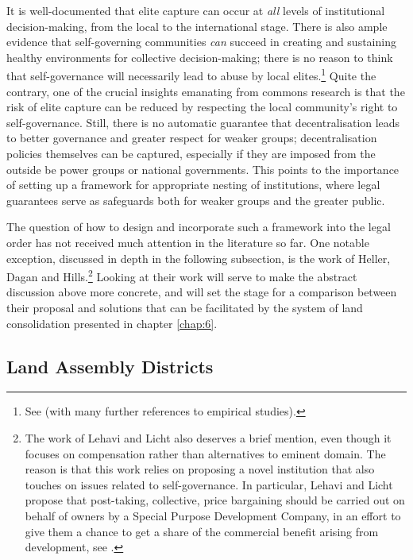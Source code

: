 It is well-documented that elite capture can occur at {\it all} levels of institutional decision-making, from the local to the international stage. There is also ample evidence that self-governing communities {\it can} succeed in creating and sustaining healthy environments for collective decision-making; there is no reason to think that self-governance will necessarily lead to abuse by local elites.\footnote{See \cite{andersson08} (with many further references to empirical studies).} Quite the contrary, one of the crucial insights emanating from commons research is that the risk of elite capture can be reduced by respecting the local community's right to self-governance. Still, there is no automatic guarantee that decentralisation leads to better governance and greater respect for weaker groups; decentralisation policies themselves can be captured, especially if they are imposed from the outside be power groups or national governments. This points to the importance of setting up a framework for appropriate nesting of institutions, where legal guarantees serve as safeguards both for weaker groups and the greater public. 

The question of how to design and incorporate such a framework into the legal order has not received much attention in the literature so far. One notable exception, discussed in depth in the following subsection, is the work of Heller, Dagan and Hills.\footnote{The work of Lehavi and Licht also deserves a brief mention, even though it focuses on compensation rather than alternatives to eminent domain. The reason is that this work relies on proposing a novel institution that also touches on issues related to self-governance. In particular, Lehavi and Licht propose that post-taking, collective, price bargaining should be carried out on behalf of owners by a Special Purpose Development Company, in an effort to give them a chance to get a share of the commercial benefit arising from development, see \cite{lehavi07}.} Looking at their work will serve to make the abstract discussion above more concrete, and will set the stage for a comparison between their proposal and solutions that can be facilitated by the system of land consolidation presented in chapter \ref{chap:6}.

\subsection{Land Assembly Districts}\label{sec:3:6:1}

